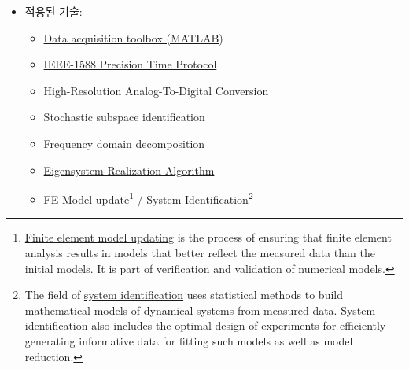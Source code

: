 \documentclass[10pt,a4paper,ragged2e]{altacv}
\begin{document}
\begin{fullwidth}
\begin{itemize}
\begin{itemize}
    \item 모드정보 추출 : SSI(Stochastic subspace identification)\footnote{The data driven \href{http://www.svibs.com/solutions/literature/2006_2.pdf}{\textbf{Stochastic Subspace Identification}} techniques is considered to be the most powerful class of the known identification techniques for natural input modal analysis in the time domain. Refer to B. Peeters and G. D. Rodeck (1999), ``\href{ftp://193.136.28.78/pub/Personal/Dec/filipema/public/FCT_WindOMA/ref_8.pdf}{Reference-based Stochastic Subspace Identification for Output-only Modal Analysis}'', \emph{Mechanical Systems and Signal Processing} (1999) 13(6), 855\}878} 기법과 \href{https://en.wikipedia.org/wiki/Frequency_domain_decomposition}{FDD(Frequency domain decomposition)}\footnote{The \href{https://en.wikipedia.org/wiki/Frequency_domain_decomposition}{frequency domain decomposition (FDD)} is an output-only system identification technique popular in civil engineering, in particular in structural health monitoring. As an output-only algorithm, it is useful when the input data is unknown. FDD is a modal analysis technique which generates a system realization using the frequency response given (multi-)output data} 기법을 적용 
  \end{itemize}
\item 적용된 기술:
  \begin{itemize}
 \item \href{http://kr.mathworks.com/products/daq/}{Data acquisition toolbox (MATLAB)}
 \item \href{https://ko.wikipedia.org/wiki/IEEE_1588}{IEEE-1588 Precision Time Protocol}
 \item High-Resolution Analog-To-Digital Conversion
 \item Stochastic subspace identification
 \item Frequency domain decomposition
 \item \href{https://en.wikipedia.org/wiki/Eigensystem_realization_algorithm}{Eigensystem Realization Algorithm}
 \item \href{https://en.wikipedia.org/wiki/Finite_element_updating}{FE Model update}\footnote{\href{https://en.wikipedia.org/wiki/Finite_element_updating}{Finite element model updating} is the process of ensuring that finite element analysis results in models that better reflect the measured data than the initial models. It is part of verification and validation of numerical models.} / \href{https://en.wikipedia.org/wiki/System_identification}{System Identification}\footnote{The field of \href{https://en.wikipedia.org/wiki/System_identification}{system identification} uses statistical methods to build mathematical models of dynamical systems from measured data. System identification also includes the optimal design of experiments for efficiently generating informative data for fitting such models as well as model reduction.}

\end{itemize}
\end{itemize}
\end{fullwidth}
\end{document}
